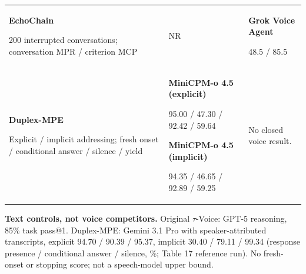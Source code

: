 \begin{table}[H]
\begin{tabular}{@{}>{\raggedright\arraybackslash}p{0.28\tablewidth}>{\raggedright\arraybackslash}p{0.44\tablewidth}>{\raggedright\arraybackslash}p{0.28\tablewidth}@{}}
\addlinespace[2pt]
\textbf{EchoChain}\par 200 interrupted conversations; conversation MPR / criterion MCP\par\citep{echochain} & NR & \textbf{Grok Voice Agent}\par 48.5 / 85.5 \\
\addlinespace[2pt]
\textbf{Duplex-MPE}\par Explicit / implicit addressing; fresh onset / conditional answer / silence / yield\par\citep{mpe} & \textbf{MiniCPM-o 4.5 (explicit)}\par 95.00 / 47.30 / 92.42 / 59.64\par\smallskip \textbf{MiniCPM-o 4.5 (implicit)}\par 94.35 / 46.65 / 92.89 / 59.25 & No closed voice result. \\
\bottomrule
\end{tabular}
\end{table}

\smallskip
{\small\textbf{Text controls, not voice competitors.} Original $\tau$-Voice: GPT-5 reasoning, 85\% task pass@1. Duplex-MPE: Gemini 3.1 Pro with speaker-attributed transcripts, explicit 94.70 / 90.39 / 95.37, implicit 30.40 / 79.11 / 99.34 (response presence / conditional answer / silence, \%; Table 17 reference run). No fresh-onset or stopping score; not a speech-model upper bound. \citep{tauvoice,mpe}}

